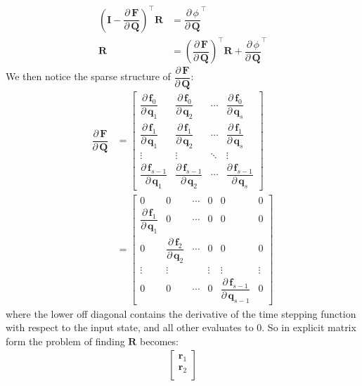 \documentclass{article}
\newcommand{\pd}[2]{\dfrac{\partial\, #1}{\partial\, #2}}
\begin{document}
\begin{derivation}
\begin{equation*}
\begin{aligned}
\left(\mathbf{I} - \pd{\mathbf{F}}{\mathbf{Q}}\right)^\top\mathbf{R} 
    &= 
\pd{\phi}{\mathbf{Q}}^\top \\[1ex]
\mathbf{R} 
    &= 
\left(\pd{\mathbf{F}}{\mathbf{Q}}\right)^\top\mathbf{R} + \pd{\phi}{\mathbf{Q}}^\top
\end{aligned}
\end{equation*}
We then notice the sparse structure of $\pd{\mathbf{F}}{\mathbf{Q}}$:
\begin{equation*}
\begin{aligned}
\pd{\mathbf{F}}{\mathbf{Q}} &= 
\begin{bmatrix}
    \pd{\mathbf{f}_0}{\mathbf{q}_1} & 
    \pd{\mathbf{f}_0}{\mathbf{q}_2} & 
    \cdots &
    \pd{\mathbf{f}_0}{\mathbf{q}_s} 
    \\[0.5ex]
    \pd{\mathbf{f}_1}{\mathbf{q}_1} & 
    \pd{\mathbf{f}_1}{\mathbf{q}_2} & 
    \cdots &
    \pd{\mathbf{f}_1}{\mathbf{q}_s} 
    \\[0.5ex]
     \vdots & \vdots & \ddots & \vdots \\[0.5ex]
    \pd{\mathbf{f}_{s-1}}{\mathbf{q}_1} & 
    \pd{\mathbf{f}_{s-1}}{\mathbf{q}_2} & 
    \cdots &
    \pd{\mathbf{f}_{s-1}}{\mathbf{q}_s} 
\end{bmatrix} \\[2ex]
&=
\begin{bmatrix}
0 & 0 & \cdots & 0 & 0 & 0 \\[0.5ex]
\pd{\mathbf{f}_1}{\mathbf{q}_1} & 0 & \cdots & 0 & 0 & 0 \\[0.5ex]
0& \pd{\mathbf{f}_2}{\mathbf{q}_2}  & \cdots & 0 & 0 & 0 \\[0.5ex]
\vdots & \vdots &  & \vdots & \vdots & \vdots \\[0.5ex]
0 & 0 & \cdots & 0 & \pd{\mathbf{f}_{s-1}}{\mathbf{q}_{s-1}} & 0
\end{bmatrix}
\end{aligned}
\end{equation*}
where the lower off diagonal contains the derivative of the time stepping function with respect to the input state, and all other evaluates to 0. So in explicit matrix form the problem of finding $\mathbf{R}$ becomes:
\begin{equation*}
\begin{aligned}
\begin{bmatrix}
    \mathbf{r}_1\\[0.5ex]
    \mathbf{r}_2\\[0.5ex]

\end{bmatrix}
\end{aligned}
\end{equation*}
\end{derivation}
\end{document}

